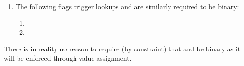 \begin{enumerate}
\begin{enumerate}
			\item \txnDataHubRequiresEvmExecution   {}
			\item \txnDataHubCopyTxcd               {}
			\item \txnDataHubStatusCode             {}
			\item \txnDataHubEipBeaconRoot          {}
			\item \txnDataHubEipBlockHash           {}
		\end{enumerate}
	\item
		The following flags trigger lookups and are similarly required to be binary:
		\begin{enumerate}
			\item \eucFlag{}
			\item \wcpFlag{}
		\end{enumerate}
\end{enumerate}
\saNote{}
There is in reality no reason to require (by constraint) that \txCopyTxcd{} and \isLastTxOfBlock{} be binary as it will be enforced through value assignment.

